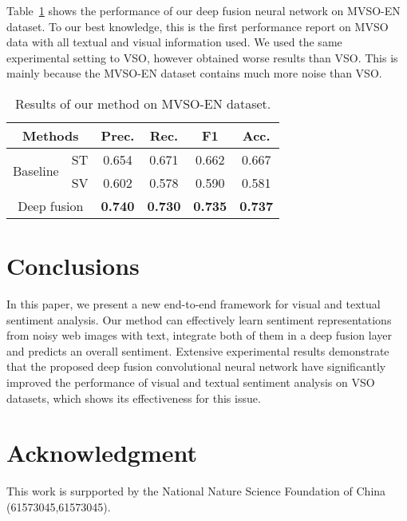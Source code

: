 \documentclass{article}
\begin{document}

Table~\ref{tab:MSVO} shows the performance of our deep fusion neural network on MVSO-EN dataset. To our best knowledge, this is the first performance report on MVSO data with all textual and visual information used. We used the same experimental setting to VSO, however obtained worse results than VSO. This is mainly because the MVSO-EN dataset contains much more noise than VSO.
 \vspace{-0.4cm}
\begin{table}[h]
	\centering
	\caption{Results of our method on MVSO-EN dataset.}
	\label{tab:MSVO}
	\begin{tabular}{c|c|c|c|c|c}
        \hline
        \multicolumn{2}{c|}{\textbf{Methods}} & \textbf{Prec.} & \textbf{Rec.} & \textbf{F1} & \textbf{Acc.} \\
        \hline
        \multirow{2}{*}{Baseline}& ST& 0.654 & 0.671 & 0.662 &  0.667 \\
        \cline{2-6}
                                 & SV & 0.602 &0.578  & 0.590 &  0.581 \\
        \hline
        \multicolumn{2}{c|}{ Deep fusion} & \textbf{0.740} & \textbf{0.730} & \textbf{0.735} & \textbf{0.737}  \\
        \hline

	\end{tabular}
	\vspace{-0.3cm}
\end{table}
\vspace{-0.3cm}
\section{Conclusions}
\vspace{-0.3cm}
\label{sec:ref}
In this paper, we present a new end-to-end framework for visual and textual sentiment analysis. Our method can effectively learn sentiment representations from noisy web images with text,  integrate both of them in a deep fusion layer and predicts an overall sentiment.
Extensive experimental results demonstrate that the proposed deep fusion convolutional neural network have significantly improved the performance of visual and textual sentiment analysis on VSO datasets, which shows its effectiveness for this issue.
\vspace{-0.4cm}
\section*{Acknowledgment}
\vspace{-0.3cm}
This work is surpported by the National Nature Science Foundation of China (61573045,61573045).


\end{document}
